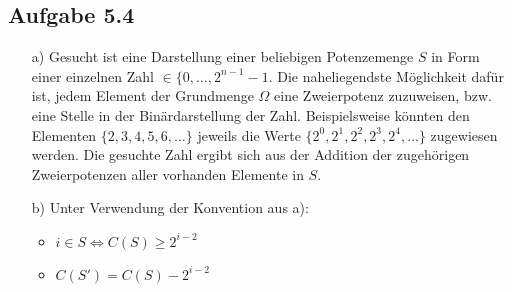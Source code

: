 \documentclass{article}
\begin{document}
    \subsection*{Aufgabe 5.4}
    \begin{enumerate}
        \item[a)] Gesucht ist eine Darstellung einer beliebigen Potenzemenge $S$ in Form einer einzelnen Zahl $\in \{0, \ldots, 2^{n-1}-1$. Die naheliegendste Möglichkeit dafür ist, jedem Element der Grundmenge $\Omega$ eine Zweierpotenz zuzuweisen, bzw. eine Stelle in der Binärdarstellung der Zahl. Beispielsweise könnten den Elementen $\{2,3,4,5,6,\ldots\}$ jeweils die Werte $\{2^0, 2^1, 2^2, 2^3, 2^4, \ldots \}$ zugewiesen werden. Die gesuchte Zahl ergibt sich aus der Addition der zugehörigen Zweierpotenzen aller vorhanden Elemente in $S$.
        \item[b)] Unter Verwendung der Konvention aus a):
        \begin{itemize}
            \item $i \in S \Leftrightarrow C(S) \geq 2^{i-2}$
            \item $C(S') = C(S) - 2^{i-2}$
        \end{itemize} 
    \end{enumerate}
\end{document}
